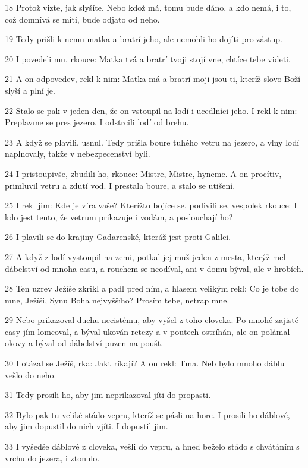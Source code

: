 \par 18 Protož vizte, jak slyšíte. Nebo kdož má, tomu bude dáno, a kdo nemá, i to, což domnívá se míti, bude odjato od neho.
\par 19 Tedy prišli k nemu matka a bratrí jeho, ale nemohli ho dojíti pro zástup.
\par 20 I povedeli mu, rkouce: Matka tvá a bratrí tvoji stojí vne, chtíce tebe videti.
\par 21 A on odpovedev, rekl k nim: Matka má a bratrí moji jsou ti, kteríž slovo Boží slyší a plní je.
\par 22 Stalo se pak v jeden den, že on vstoupil na lodí i ucedlníci jeho. I rekl k nim: Preplavme se pres jezero. I odstrcili lodí od brehu.
\par 23 A když se plavili, usnul. Tedy prišla boure tuhého vetru na jezero, a vlny lodí naplnovaly, takže v nebezpecenství byli.
\par 24 I pristoupivše, zbudili ho, rkouce: Mistre, Mistre, hyneme. A on procítiv, primluvil vetru a zdutí vod. I prestala boure, a stalo se utišení.
\par 25 I rekl jim: Kde je víra vaše? Kterížto bojíce se, podivili se, vespolek rkouce: I kdo jest tento, že vetrum prikazuje i vodám, a poslouchají ho?
\par 26 I plavili se do krajiny Gadarenské, kteráž jest proti Galilei.
\par 27 A když z lodí vystoupil na zemi, potkal jej muž jeden z mesta, kterýž mel dábelství od mnoha casu, a rouchem se neodíval, ani v domu býval, ale v hrobích.
\par 28 Ten uzrev Ježíše zkrikl a padl pred ním, a hlasem velikým rekl: Co je tobe do mne, Ježíši, Synu Boha nejvyššího? Prosím tebe, netrap mne.
\par 29 Nebo prikazoval duchu necistému, aby vyšel z toho cloveka. Po mnohé zajisté casy jím lomcoval, a býval ukován retezy a v poutech ostríhán, ale on polámal okovy a býval od dábelství puzen na poušt.
\par 30 I otázal se Ježíš, rka: Jakt ríkají? A on rekl: Tma. Neb bylo mnoho dáblu vešlo do neho.
\par 31 Tedy prosili ho, aby jim neprikazoval jíti do propasti.
\par 32 Bylo pak tu veliké stádo vepru, kteríž se pásli na hore. I prosili ho dáblové, aby jim dopustil do nich vjíti. I dopustil jim.
\par 33 I vyšedše dáblové z cloveka, vešli do vepru, a hned beželo stádo s chvátáním s vrchu do jezera, i ztonulo.

